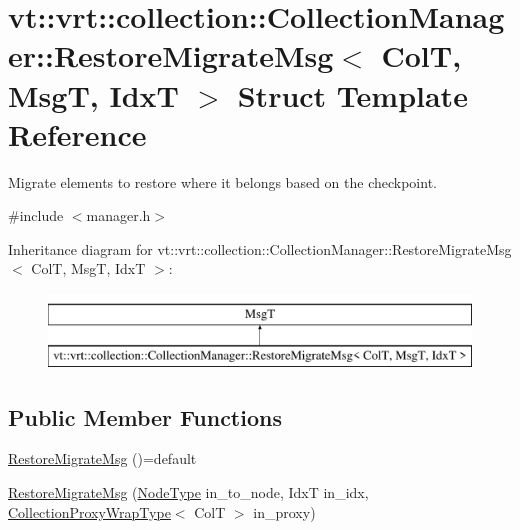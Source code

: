 \hypertarget{structvt_1_1vrt_1_1collection_1_1_collection_manager_1_1_restore_migrate_msg}{}\section{vt\+:\+:vrt\+:\+:collection\+:\+:Collection\+Manager\+:\+:Restore\+Migrate\+Msg$<$ ColT, MsgT, IdxT $>$ Struct Template Reference}
\label{structvt_1_1vrt_1_1collection_1_1_collection_manager_1_1_restore_migrate_msg}


Migrate elements to restore where it belongs based on the checkpoint.  




{\ttfamily \#include $<$manager.\+h$>$}

Inheritance diagram for vt\+:\+:vrt\+:\+:collection\+:\+:Collection\+Manager\+:\+:Restore\+Migrate\+Msg$<$ ColT, MsgT, IdxT $>$\+:\begin{figure}[H]
\begin{center}
\leavevmode
\includegraphics[height=2.000000cm]{structvt_1_1vrt_1_1collection_1_1_collection_manager_1_1_restore_migrate_msg}
\end{center}
\end{figure}
\subsection*{Public Member Functions}
\begin{DoxyCompactItemize}
\item 
\hyperlink{structvt_1_1vrt_1_1collection_1_1_collection_manager_1_1_restore_migrate_msg_ac4dbb8856fdb35a40e2cdebbff085a7e}{Restore\+Migrate\+Msg} ()=default
\item 
\hyperlink{structvt_1_1vrt_1_1collection_1_1_collection_manager_1_1_restore_migrate_msg_af3b9150bfabb3aa3141c33d618b17f1f}{Restore\+Migrate\+Msg} (\hyperlink{namespacevt_a866da9d0efc19c0a1ce79e9e492f47e2}{Node\+Type} in\+\_\+to\+\_\+node, IdxT in\+\_\+idx, \hyperlink{structvt_1_1vrt_1_1collection_1_1_collection_manager_a56458ed7f9bb22b631b9b3a745f42f94}{Collection\+Proxy\+Wrap\+Type}$<$ ColT $>$ in\+\_\+proxy)
\end{DoxyCompactItemize}
